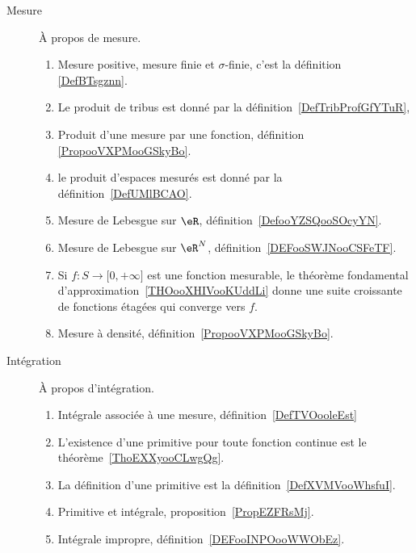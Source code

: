 
\begin{description}
    \item[Mesure] 
    À propos de mesure.
\begin{enumerate}
    \item
        Mesure positive, mesure finie et \( \sigma\)-finie, c'est la définition \ref{DefBTsgznn}.

    \item Le produit de tribus est donné par la définition~\ref{DefTribProfGfYTuR},     %
    \item
        Produit d'une mesure par une fonction, définition \ref{PropooVXPMooGSkyBo}.
    \item le produit d'espaces mesurés est donné par la définition~\ref{DefUMlBCAO}.     %
        \item
            Mesure de Lebesgue sur \( \eR\), définition~\ref{DefooYZSQooSOcyYN}.
        \item
            Mesure de Lebesgue sur \( \eR^N\), définition~\ref{DEFooSWJNooCSFeTF}.
        \item

            Si \( f\colon S\to \mathopen[ 0 , +\infty \mathclose]\) est une fonction mesurable, le théorème fondamental d'approximation~\ref{THOooXHIVooKUddLi} donne une suite croissante de fonctions étagées qui converge vers \( f\).
        \item
            Mesure à densité, définition~\ref{PropooVXPMooGSkyBo}.
\end{enumerate}
\item[Intégration]
    À propos d'intégration.
    \begin{enumerate}
        \item
            Intégrale associée à une mesure, définition~\ref{DefTVOooleEst}
    \item
        L'existence d'une primitive pour toute fonction continue est le théorème~\ref{ThoEXXyooCLwgQg}.
    \item
        La définition d'une primitive est la définition~\ref{DefXVMVooWhsfuI}.
    \item
        Primitive et intégrale, proposition~\ref{PropEZFRsMj}.
    \item
        Intégrale impropre, définition~\ref{DEFooINPOooWWObEz}.
\end{enumerate}
            
\end{description}

